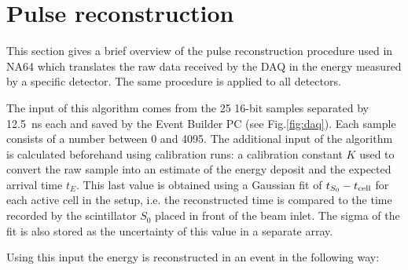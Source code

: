 \section{Pulse reconstruction}

This section gives a brief overview of the pulse reconstruction procedure used in NA64 which translates the raw data received by the DAQ in the energy measured by a specific detector. The same procedure is applied to all detectors.

The input of this algorithm comes from the 25 16-bit samples separated by \SI{12.5}{\nano\second} each and saved by the Event Builder PC (see Fig.\ref{fig:daq}). Each sample consists of a number between 0 and 4095. The additional input of the algorithm is calculated beforehand using calibration runs: a calibration constant $K$ used to convert the raw sample into an estimate of the energy deposit and the expected arrival time $t_E$. This last value is obtained using a Gaussian fit of $t_{S_0} - t_{\rm{cell}}$ for each active cell in the setup, i.e. the reconstructed time is compared to the time recorded by the scintillator $S_0$ placed in front of the beam inlet. The sigma of the fit is also stored as the uncertainty of this value in a separate array.

Using this input the energy is reconstructed in an event in the following way:

